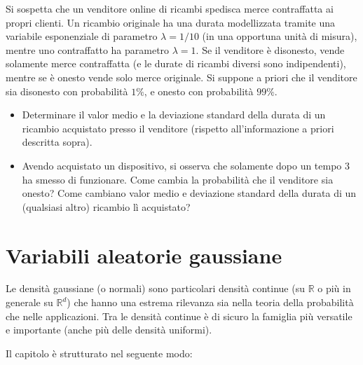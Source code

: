\documentclass[
  italian,
  letterpaper,
]{book}
\providecommand{\tightlist}{%
  \setlength{\itemsep}{0pt}\setlength{\parskip}{0pt}}
\newcommand{\R}{\mathbb{R}}
\theoremstyle{definition}
\theoremstyle{remark}
\begin{document}
Si sospetta che un venditore online di ricambi spedisca merce
contraffatta ai propri clienti. Un ricambio originale ha una durata
modellizzata tramite una variabile esponenziale di parametro
\(\lambda = 1/10\) (in una opportuna unità di misura), mentre uno
contraffatto ha parametro \(\lambda=1\). Se il venditore è disonesto,
vende solamente merce contraffatta (e le durate di ricambi diversi sono
indipendenti), mentre se è onesto vende solo merce originale. Si suppone
a priori che il venditore sia disonesto con probabilità \(1\%\), e
onesto con probabilità \(99\%\).

\begin{itemize}
\tightlist
\item
  Determinare il valor medio e la deviazione standard della durata di un
  ricambio acquistato presso il venditore (rispetto all'informazione a
  priori descritta sopra).
\item
  Avendo acquistato un dispositivo, si osserva che solamente dopo un
  tempo \(3\) ha smesso di funzionare. Come cambia la probabilità che il
  venditore sia onesto? Come cambiano valor medio e deviazione standard
  della durata di un (qualsiasi altro) ricambio lì acquistato?
\end{itemize}


\chapter{Variabili aleatorie
gaussiane}\label{variabili-aleatorie-gaussiane}

Le densità gaussiane (o normali) sono particolari densità continue (su
\(\R\) o più in generale su \(\R^d\)) che hanno una estrema rilevanza
sia nella teoria della probabilità che nelle applicazioni. Tra le
densità continue è di sicuro la famiglia più versatile e importante
(anche più delle densità uniformi).

Il capitolo è strutturato nel seguente modo:
\end{document}
